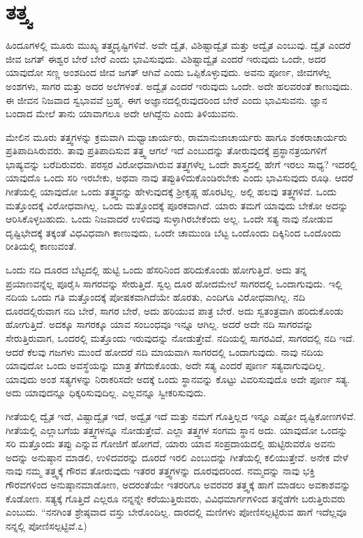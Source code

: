 \section*{ತತ್ತ್ವ}

ಹಿಂದೂಗಳಲ್ಲಿ ಮೂರು ಮುಖ್ಯ ತತ್ತ್ವದೃಷ್ಟಿಗಳಿವೆ. ಅವೇ ದ್ವೈತ, ವಿಶಿಷ್ಟಾದ್ವೈತ ಮತ್ತು ಅದ್ವೈತ ಎಂಬುವು. ದ್ವೈತ ಎಂದರೆ ಜೀವ ಜಗತ್ ಈಶ್ವರ ಬೇರೆ ಬೇರೆ ಎಂದು ಭಾವಿಸುವುದು. ವಿಶಿಷ್ಟಾದ್ವೈತ ಎಂದರೆ ಇರುವುದು ಒಂದೇ, ಅದರ ಯಾವುದೋ ಸಣ್ಣ ಅಂಶದಿಂದ ಜೀವ ಜಗತ್ ಆಗಿವೆ ಎಂದು ಒಪ್ಪಿಕೊಳ್ಳುವುದು. ಅವನು ಪೂರ್ಣ, ಜೀವಗಳೆಲ್ಲ ಅಂಶಗಳು, ಸಾಗರ ಮತ್ತು ಅದರ ಅಲೆಗಳಂತೆ. ಅದ್ವೈತ ಎಂದರೆ ಇರುವುದು ಒಂದೇ. ಅದೇ ಹಲವರಂತೆ ಕಾಣುವುದು. ಈ ಜೀವನ ನಿಜವಾದ ಸ್ವಭಾವವೆ ಬ್ರಹ್ಮ. ಈಗ ಅಜ್ಞಾನದಲ್ಲಿರುವುದರಿಂದ ಬೇರೆ ಎಂದು ಭಾವಿಸುವನು. ಜ್ಞಾನ ಬಂದಾದ ಮೇಲೆ ತಾನು ಯಾವಾಗಲೂ ಅದೇ ಆಗಿದ್ದೆನು ಎಂದು ತಿಳಿಯುವನು.

ಮೇಲಿನ ಮೂರು ತತ್ತ್ವಗಳನ್ನು ಕ್ರಮವಾಗಿ ಮಧ್ವಾಚಾರ್ಯರು, ರಾಮಾನುಜಾಚಾರ್ಯರು ಹಾಗೂ ಶಂಕರಾಚಾರ್ಯರು ಪ್ರತಿಪಾದಿಸಿರುವರು. ತಾವು ಪ್ರತಿಪಾದಿಸುವ ತತ್ತ್ವ ಆಗಲೆ ಇದೆ ಎಂಬುದನ್ನು ತೋರುವುದಕ್ಕೆ ಪ್ರಸ್ಥಾನತ್ರಯಗಳಿಗೆ ಭಾಷ್ಯವನ್ನು ಬರೆದಿರುವರು. ಪರಸ್ಪರ ವಿರೋಧವಾಗಿರುವ ತತ್ತ್ವಗಳೆಲ್ಲ ಒಂದೇ ಶಾಸ್ತ್ರದಲ್ಲಿ ಹೇಗೆ ಇರಲು ಸಾಧ್ಯ? ಇದರಲ್ಲಿ ಯಾವುದೊ ಒಂದು ಸರಿ ಇರಬೇಕು, ಅಥವಾ ನಾವು ತಪ್ಪುತಿಳಿದುಕೊಂಡಿರಬೇಕು ಎಂದು ಭಾವಿಸುವುದು ರೂಢಿ. ಆದರೆ ಗೀತೆಯಲ್ಲಿ ಯಾವುದೋ ಒಂದು ತತ್ತ್ವವನ್ನು ಹೇಳುವುದಕ್ಕೆ ಶ್ರೀಕೃಷ್ಣ ಹೊರಟಿಲ್ಲ. ಅಲ್ಲಿ ಹಲವು ತತ್ತ್ವಗಳಿವೆ. ಒಂದು ಮತ್ತೊಂದಕ್ಕೆ ವಿರೋಧವಾಗಿಲ್ಲ. ಒಂದು ಮತ್ತೊಂದಕ್ಕೆ ಪೂರಕವಾಗಿದೆ. ಯಾರು ತಮಗೆ ಯಾವುದು ಬೇಕೋ ಅದನ್ನು ಆರಿಸಿಕೊಳ್ಳಬಹುದು. ಒಂದು ನಿಜವಾದರೆ ಉಳಿದವು ಸುಳ್ಳಾಗಿರಬೇಕೆಂದು ಅಲ್ಲ. ಒಂದೇ ಸತ್ಯ ನಾವು ನೋಡುವ ದೃಷ್ಟಿಭೇದಕ್ಕೆ ತಕ್ಕಂತೆ ವಿಧವಿಧವಾಗಿ ಕಾಣುವುದು, ಒಂದೇ ಚಾಮುಂಡಿ ಬೆಟ್ಟ ಒಂದೊಂದು ದಿಕ್ಕಿನಿಂದ ಒಂದೊಂದು ರೀತಿಯಲ್ಲಿ ಕಾಣುವಂತೆ.

ಒಂದು ನದಿ ದೂರದ ಬೆಟ್ಟದಲ್ಲಿ ಹುಟ್ಟಿ ಒಂದು ಹೆಸರಿನಿಂದ ಹರಿದುಕೊಂಡು ಹೋಗುತ್ತಿದೆ. ಅದು ತನ್ನ ಪ್ರಯಾಣವನ್ನೆಲ್ಲ ಪೂರೈಸಿ ಸಾಗರವನ್ನು ಸೇರುತ್ತಿದೆ. ಸ್ವಲ್ಪ ದೂರ ಹೋದಮೇಲೆ ಸಾಗರದಲ್ಲಿ ಒಂದಾಗುವುದು. ಇಲ್ಲಿ ನದಿಯ ಒಂದು ಗತಿ ಮತ್ತೊಂದಕ್ಕೆ ಪೋಷಕವಾಗಿದೆಯೇ ಹೊರತು, ಎಂದಿಗೂ ವಿರೋಧವಾಗಿಲ್ಲ. ನದಿ ದೂರದಲ್ಲಿರುವಾಗ ನದಿ ಬೇರೆ, ಸಾಗರ ಬೇರೆ, ಅದು ಹರಿಯುವ ಪಾತ್ರ ಬೇರೆ. ಅದು ಸ್ವತಂತ್ರವಾಗಿ ಹರಿದುಕೊಂಡು ಹೋಗುತ್ತಿದೆ. ಅದಕ್ಕೂ ಸಾಗರಕ್ಕೂ ಯಾವ ಸಂಬಂಧವೂ ಇನ್ನೂ ಆಗಿಲ್ಲ. ಅದರೆ ಅದೇ ನದಿ ಸಾಗರವನ್ನು ಸೇರುತ್ತಿರುವಾಗ, ಒಂದರಲ್ಲಿ ಮತ್ತೊಂದು ಇರುವುದನ್ನು ನೋಡುತ್ತೇವೆ. ನದಿಯಲ್ಲಿ ಸಾಗರವಿದೆ, ಸಾಗರದಲ್ಲಿ ನದಿ ಇದೆ. ಆದರೆ ಕೆಲವು ಗಜಗಳು ಮುಂದೆ ಹೋದರೆ ನದಿ ಮಾಯವಾಗಿ ಸಾಗರದಲ್ಲಿ ಒಂದಾಗುವುದು. ನಾವು ನದಿಯ ಯಾವುದೋ ಒಂದು ಅವಸ್ಥೆಯನ್ನು ಮಾತ್ರ ತೆಗೆದುಕೊಂಡು, ಅದೇ ಸತ್ಯ ಎಂದರೆ ಪೂರ್ಣ ಸತ್ಯವಾಗುವುದಿಲ್ಲ. ಯಾವುದು ಅಂಶ ಸತ್ಯಗಳನ್ನು ನಿರಾಕರಿಸದೇ ಅದಕ್ಕೆ ಒಂದು ಸ್ಥಾನವನ್ನು ಕೊಟ್ಟು ವಿವರಿಸುವುದೊ ಅದೇ ಪೂರ್ಣ ಸತ್ಯ. ಅದು ಯಾವುದನ್ನೂ ಧಿಕ್ಕರಿಸುವುದಿಲ್ಲ. ಎಲ್ಲವನ್ನೂ ಸ್ವೀಕರಿಸುವುದು.

ಗೀತೆಯಲ್ಲಿ ದ್ವೈತ ಇದೆ, ವಿಷ್ಟಾದ್ವೈತ ಇದೆ, ಅದ್ವೈತ ಇದೆ ಮತ್ತು ನಮಗೆ ಗೊತ್ತಿಲ್ಲದ ಇನ್ನೂ ಎಷ್ಟೋ ದೃಷ್ಟಿಕೋಣಗಳಿವೆ. ಗೀತೆಯಲ್ಲಿ ಎಲ್ಲಾಬಗೆಯ ತತ್ತ್ವಗಳನ್ನೂ ನೋಡುತ್ತೇವೆ. ಎಲ್ಲಾ ತತ್ತ್ವಗಳ ಸಂಗಮ ಸ್ಥಾನ ಅದು. ಯಾವುದೋ ಒಂದನ್ನು ಸರಿ ಮತ್ತೊಂದು ತಪ್ಪು ಎನ್ನುವ ಗೋಜಿಗೆ ಹೋಗದೆ, ಯಾರು ಯಾವ ಸಂಪ್ರದಾಯದಲ್ಲಿ ಹುಟ್ಟಿರುವರೊ ಅವನು ಅದನ್ನು ಅನುಷ್ಠಾನ ಮಾಡಲಿ, ಉಳಿದವರನ್ನು ದೂರದೆ ಇರಲಿ ಎಂಬುದನ್ನು ಗೀತೆಯಲ್ಲಿ ಕಲಿಯುತ್ತೇವೆ. ಅನೇಕ ವೇಳೆ ನಾವು ನಮ್ಮ ತತ್ತ್ವಕ್ಕೆ ಗೌರವ ತೋರುವುದು ಇತರರ ತತ್ತ್ವಗಳನ್ನು ದೂರವುದರಿಂದ. ನಮ್ಮದನ್ನು ನಾವು ಭಕ್ತಿ ಗೌರವಗಳಿಂದ ಅನುಷ್ಠಾನಮಾಡೋಣ, ಅದರಂತೆಯೇ ಇತರರಿಗೂ ಅವರವರ ತತ್ತ್ವಕ್ಕೆ ಹಾಗೆ ಮಾಡಲು ಅವಕಾಶವನ್ನು ಕೊಡೋಣ. ಸತ್ಯಕ್ಕೆ ಗೊತ್ತಿದೆ ಎಲ್ಲರೂ ನನ್ನನ್ನೇ ಕರೆಯುತ್ತಿರುವರು, ವಿವಿಧಮಾರ್ಗಗಳಿಂದ ತನ್ನೆಡೆಗೇ ಬರುತ್ತಿರುವರು ಎಂಬುದು. “ನನಗಿಂತ ಶ್ರೇಷ್ಠವಾದ ವಸ್ತು ಬೇರೊಂದಿಲ್ಲ. ದಾರದಲ್ಲಿ ಮಣಿಗಳು ಪೋಣಿಸಲ್ಪಟ್ಟಿರುವ ಹಾಗೆ ಇದೆಲ್ಲವೂ ನನ್ನಲ್ಲಿ ಪೋಣಿಸಲ್ಪಟ್ಟಿವೆ.೭)


